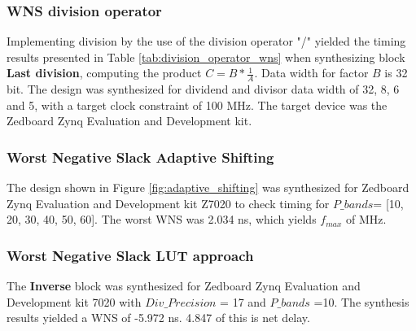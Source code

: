 \subsubsection{WNS division operator}
Implementing division by the use of the division operator "/" yielded the timing results presented in Table \ref{tab:division_operator_wns} when synthesizing block \textbf{Last division}, computing the product $C= B*\frac{1}{A}$. Data width for factor $B$ is 32 bit. The design was synthesized for dividend and divisor data width of 32, 8, 6 and 5, with a target clock constraint of 100 MHz. The target device was the Zedboard Zynq Evaluation and Development kit. 
\begin{table}[H]
    \centering
    \caption{Synthesis results for ZedBoard Zynq Evaluation and Development Kit for \textbf{Last division} using division operator "/".}
    \label{tab:division_operator_wns}
\end{table}
\subsubsection{Worst Negative Slack Adaptive Shifting}
 The design shown in Figure \ref{fig:adaptive_shifting} was synthesized for Zedboard Zynq Evaluation and Development kit Z7020 to check timing for $P\_bands$= [10, 20, 30, 40, 50, 60]. The worst WNS was 2.034 ns, which yields $f_{max}$ of  MHz. 
 
 
 
 \subsubsection{Worst Negative Slack LUT approach}
 The \textbf{Inverse} block was synthesized for Zedboard Zynq Evaluation and Development kit 7020 with $Div\_Precision$ = 17 and $P\_bands$ =10. The synthesis results yielded a WNS of -5.972 ns. 4.847 of this is net delay. \\
 
